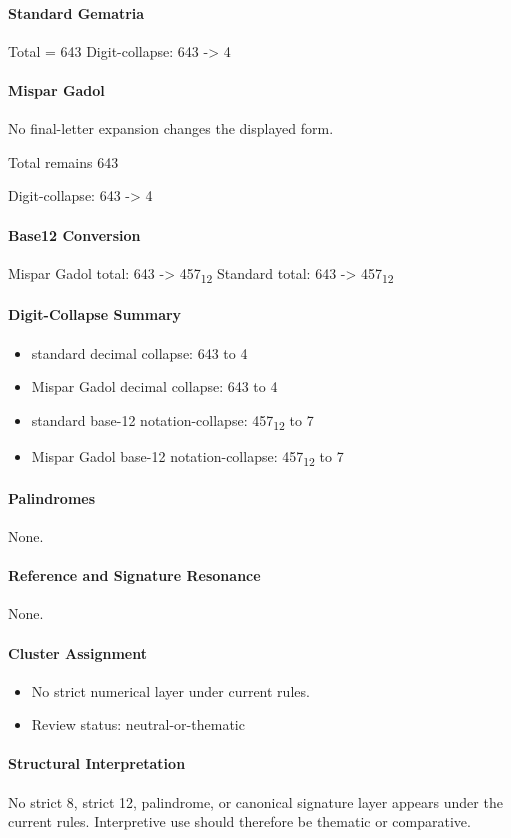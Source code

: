 \paragraph{Standard Gematria}
Total = 643
Digit-collapse: 643 -> 4
\paragraph{Mispar Gadol}
No final-letter expansion changes the displayed form.

Total remains 643

Digit-collapse: 643 -> 4
\paragraph{Base12 Conversion}
Mispar Gadol total: 643 -> 457\textsubscript{12}
Standard total: 643 -> 457\textsubscript{12}
\paragraph{Digit-Collapse Summary}
\begin{itemize}
\item standard decimal collapse: 643 to 4
\item Mispar Gadol decimal collapse: 643 to 4
\item standard base-12 notation-collapse: 457\textsubscript{12} to 7
\item Mispar Gadol base-12 notation-collapse: 457\textsubscript{12} to 7
\end{itemize}
\paragraph{Palindromes}
None.
\paragraph{Reference and Signature Resonance}
None.
\paragraph{Cluster Assignment}
\begin{itemize}
\item No strict numerical layer under current rules.
\item Review status: neutral-or-thematic
\end{itemize}
\paragraph{Structural Interpretation}
No strict 8, strict 12, palindrome, or canonical signature layer appears under the current rules. Interpretive use should therefore be thematic or comparative.


